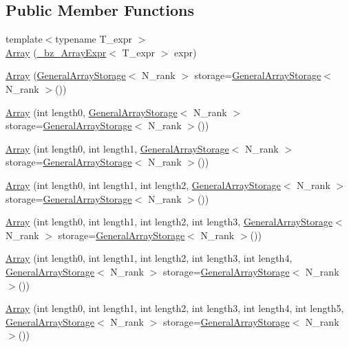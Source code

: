\subsection*{Public Member Functions}
\begin{DoxyCompactItemize}
\item 
{\footnotesize template$<$typename T\+\_\+expr $>$ }\\\hyperlink{classArray_ab601a102dca824a6dc0446273965e40d}{Array} (\hyperlink{class__bz__ArrayExpr}{\+\_\+bz\+\_\+\+Array\+Expr}$<$ T\+\_\+expr $>$ expr)
\item 
\hyperlink{classArray_af10c516fbc0c99761b4a1493f1431126}{Array} (\hyperlink{classGeneralArrayStorage}{General\+Array\+Storage}$<$ N\+\_\+rank $>$ storage=\hyperlink{classGeneralArrayStorage}{General\+Array\+Storage}$<$ N\+\_\+rank $>$())
\item 
\hyperlink{classArray_abc50cddb9eada342bccd0b87e9df35d9}{Array} (int length0, \hyperlink{classGeneralArrayStorage}{General\+Array\+Storage}$<$ N\+\_\+rank $>$ storage=\hyperlink{classGeneralArrayStorage}{General\+Array\+Storage}$<$ N\+\_\+rank $>$())
\item 
\hyperlink{classArray_ae639e151d7e76875d12290f28ac1873f}{Array} (int length0, int length1, \hyperlink{classGeneralArrayStorage}{General\+Array\+Storage}$<$ N\+\_\+rank $>$ storage=\hyperlink{classGeneralArrayStorage}{General\+Array\+Storage}$<$ N\+\_\+rank $>$())
\item 
\hyperlink{classArray_ad3094229384e53e54ab674f269232961}{Array} (int length0, int length1, int length2, \hyperlink{classGeneralArrayStorage}{General\+Array\+Storage}$<$ N\+\_\+rank $>$ storage=\hyperlink{classGeneralArrayStorage}{General\+Array\+Storage}$<$ N\+\_\+rank $>$())
\item 
\hyperlink{classArray_aafeae20c60c1ddb68b95f17769d2f4df}{Array} (int length0, int length1, int length2, int length3, \hyperlink{classGeneralArrayStorage}{General\+Array\+Storage}$<$ N\+\_\+rank $>$ storage=\hyperlink{classGeneralArrayStorage}{General\+Array\+Storage}$<$ N\+\_\+rank $>$())
\item 
\hyperlink{classArray_aa80b196ce2441a38d5622dabfb239090}{Array} (int length0, int length1, int length2, int length3, int length4, \hyperlink{classGeneralArrayStorage}{General\+Array\+Storage}$<$ N\+\_\+rank $>$ storage=\hyperlink{classGeneralArrayStorage}{General\+Array\+Storage}$<$ N\+\_\+rank $>$())
\item 
\hyperlink{classArray_ae7f870270cc5b8f5b8f85e6aba08bdf2}{Array} (int length0, int length1, int length2, int length3, int length4, int length5, \hyperlink{classGeneralArrayStorage}{General\+Array\+Storage}$<$ N\+\_\+rank $>$ storage=\hyperlink{classGeneralArrayStorage}{General\+Array\+Storage}$<$ N\+\_\+rank $>$())

\end{DoxyCompactItemize}

